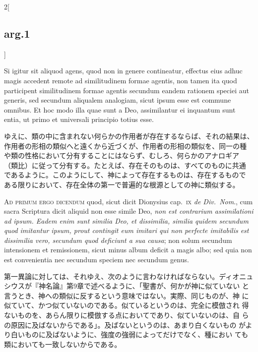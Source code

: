 \documentclass[paper=a4paper,fontsize=10pt,jafontsize=9pt,titlepage]{jlreq}
\begin{document}
\begin{paracol}{2}[\subsection{arg.1}]
\switchcolumn*

Si igitur sit aliquod agens, quod non in genere contineatur, effectus
eius adhuc magis accedent remote ad similitudinem formae agentis, non
tamen ita quod participent similitudinem formae agentis secundum
eandem rationem speciei aut generis, sed secundum aliqualem analogiam,
sicut ipsum esse est commune omnibus. Et hoc modo illa quae sunt a
Deo, assimilantur ei inquantum sunt entia, ut primo et universali
principio totius esse.

\switchcolumn

ゆえに、類の中に含まれない何らかの作用者が存在するならば、それの結果は、
作用者の形相の類似へと遠くから近づくが、作用者の形相の類似を、同一の種
や類の性格において分有することにはならず、むしろ、何らかのアナロギア
（類比）に従って分有する。たとえば、存在そのものは、すべてのものに共通
であるように。このようにして、神によって存在するものは、存在するもので
ある限りにおいて、存在全体の第一で普遍的な根源としての神に類似する。

\switchcolumn*[\subsection{ad.1}]

{\scshape Ad primum ergo dicendum} quod, sicut dicit Dionysius
cap.~{\scshape ix} {\itshape de Div.~Nom}., cum sacra Scriptura dicit
aliquid non esse simile Deo, {\itshape non est contrarium
assimilationi ad ipsum. Eadem enim sunt similia Deo, et dissimilia,
similia quidem secundum quod imitantur ipsum, prout contingit eum
imitari qui non perfecte imitabilis est dissimilia vero, secundum quod
deficiunt a sua causa}; non solum secundum intensionem et remissionem,
sicut minus album deficit a magis albo; sed quia non est convenientia
nec secundum speciem nec secundum genus.

\switchcolumn

第一異論に対しては、それゆえ、次のように言わなければならない。ディオニュ
シウスが『神名論』第9章で述べるように、「聖書が、何かが神に似ていない
と言うとき、神への類似に反するという意味ではない。実際、同じものが、神
に似ていて、かつ似ていないのである。似ているというのは、完全に模倣され
得ないものを、あらん限りに模倣する点においてであり、似ていないのは、自
らの原因に及ばないからである」。及ばないというのは、あまり白くないもの
がより白いものに及ばないように、強度の強弱によってだけでなく、種におい
ても類においても一致しないからである。

\switchcolumn*[\subsection{ad.2}]


\end{paracol}
\end{document}
